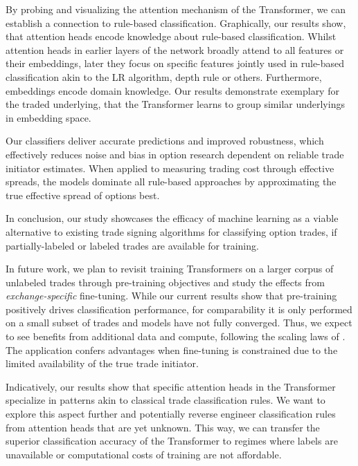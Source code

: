 By probing and visualizing the attention mechanism of the Transformer, we can establish a connection to rule-based classification. Graphically, our results show, that attention heads encode knowledge about rule-based classification. Whilst attention heads in earlier layers of the network broadly attend to all features or their embeddings, later they focus on specific features jointly used in rule-based classification akin to the \gls{LR} algorithm, depth rule or others. Furthermore, embeddings encode domain knowledge. Our results demonstrate exemplary for the traded underlying, that the Transformer learns to group similar underlyings in embedding space.

Our classifiers deliver accurate predictions and improved robustness, which effectively reduces noise and bias in option research dependent on reliable trade initiator estimates. When applied to measuring trading cost through effective spreads, the models dominate all rule-based approaches by approximating the true effective spread of options best. 

In conclusion, our study showcases the efficacy of machine learning as a viable alternative to existing trade signing algorithms for classifying option trades, if partially-labeled or labeled trades are available for training.

In future work, we plan to revisit training Transformers on a larger corpus of unlabeled trades through pre-training objectives and study the effects from \emph{exchange-specific} fine-tuning. While our current results show that pre-training positively drives classification performance, for comparability it is only performed on a small subset of trades and models have not fully converged. Thus, we expect to see benefits from additional data and compute, following the scaling laws of \textcite[][30022]{hoffmannTrainingComputeOptimalLarge2022}. The application confers advantages when fine-tuning is constrained due to the limited availability of the true trade initiator.

Indicatively, our results show that specific attention heads in the Transformer specialize in patterns akin to classical trade classification rules. We want to explore this aspect further and potentially reverse engineer classification rules from attention heads that are yet unknown. This way, we can transfer the superior classification accuracy of the Transformer to regimes where labels are unavailable or computational costs of training are not affordable.